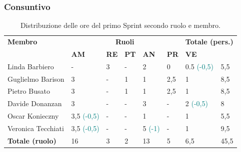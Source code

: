 \subsubsection{Consuntivo}
\begin{table}[ht!]
	\centering
	\begin{tabular}{p{3cm} p{1.5cm} p{1.5cm} p{1.5cm} p{1.5cm} p{1.5cm} p{1.5cm} p{1cm}}
		\toprule
        \textbf{Membro} & \multicolumn{5}{c}{\textbf{Ruoli}} & \multicolumn{2}{r}{\textbf{Totale
        (pers.)}}\\
		& \textbf{AM} & \textbf{RE} & \textbf{PT} & \textbf{AN} & \textbf{PR} & \textbf{VE}\\
		\midrule
        Linda Barbiero          & -     & 3     & -     & 2     & 0     & 0.5 \textcolor{teal}{(-0,5)}   & 5,5 \\
        Guglielmo Barison       & 3     & -     & 1     & 1     & 2,5   & 1     & 8,5\\
        Pietro Busato           & 3     & -     & 1     & 1     & 2,5   & 1     & 8,5 \\
        Davide Donanzan         & 3     & -     & -     & 3     & -     & 2 \textcolor{teal}{(-0,5)}     & 8 \\
        Oscar Konieczny         & 3,5 \textcolor{teal}{(-0,5)}  & -     & -     & 1     & -     & 1     & 5,5 \\
        Veronica Tecchiati      & 3,5 \textcolor{teal}{(-0,5)}  & -     & -     & 5 \textcolor{teal}{(-1)}    & -     & 1     & 9,5 \\
        \bottomrule
        \textbf{Totale (ruolo)} & 16    & 3     & 2     & 13   & 5     & 6,5   & 45,5 \\
	\end{tabular}
	\caption{Distribuzione delle ore del primo Sprint secondo ruolo e membro.}
	\label{table:Distribuzione delle ore consuntive del primo Sprint secondo ruolo e membro}
\end{table}
